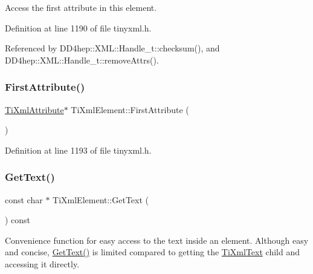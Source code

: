 Access the first attribute in this element. 



Definition at line 1190 of file tinyxml.\+h.



Referenced by D\+D4hep\+::\+X\+M\+L\+::\+Handle\+\_\+t\+::checksum(), and D\+D4hep\+::\+X\+M\+L\+::\+Handle\+\_\+t\+::remove\+Attrs().

\hypertarget{class_ti_xml_element_a4b33780fc565d38d6b54f640e0cf1737}{}\label{class_ti_xml_element_a4b33780fc565d38d6b54f640e0cf1737} 
\subsubsection{\texorpdfstring{First\+Attribute()}{FirstAttribute()}\hspace{0.1cm}{\footnotesize\ttfamily [2/2]}}
{\footnotesize\ttfamily \hyperlink{class_ti_xml_attribute}{Ti\+Xml\+Attribute}$\ast$ Ti\+Xml\+Element\+::\+First\+Attribute (\begin{DoxyParamCaption}{ }\end{DoxyParamCaption})\hspace{0.3cm}{\ttfamily [inline]}}



Definition at line 1193 of file tinyxml.\+h.

\hypertarget{class_ti_xml_element_af0f814ecbd43d50d4cdbdf4354d3da39}{}\label{class_ti_xml_element_af0f814ecbd43d50d4cdbdf4354d3da39} 
\subsubsection{\texorpdfstring{Get\+Text()}{GetText()}}
{\footnotesize\ttfamily const char $\ast$ Ti\+Xml\+Element\+::\+Get\+Text (\begin{DoxyParamCaption}{ }\end{DoxyParamCaption}) const}

Convenience function for easy access to the text inside an element. Although easy and concise, \hyperlink{class_ti_xml_element_af0f814ecbd43d50d4cdbdf4354d3da39}{Get\+Text()} is limited compared to getting the \hyperlink{class_ti_xml_text}{Ti\+Xml\+Text} child and accessing it directly.

